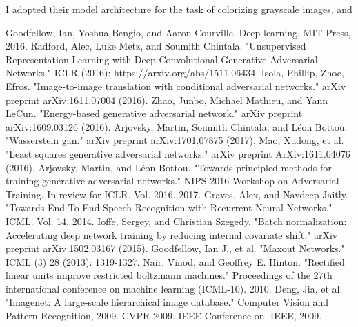 \documentclass{article}
\begin{document}
\noindent I adopted their model architecture for the task of colorizing grayscale images, and 



\pagebreak

\noindent [1] Goodfellow, Ian, Yoshua Bengio, and Aaron Courville. Deep learning. MIT Press, 2016. \newline
\noindent [2] Radford, Alec, Luke Metz, and Soumith Chintala. "Unsupervised Representation Learning with Deep Convolutional Generative Adversarial Networks." ICLR (2016): https://arxiv.org/abs/1511.06434. \newline
\noindent [3] Isola, Phillip, Zhoe, Efros. "Image-to-image translation with conditional adversarial networks." arXiv preprint arXiv:1611.07004 (2016). \newline
\noindent [4] Zhao, Junbo, Michael Mathieu, and Yann LeCun. "Energy-based generative adversarial network." arXiv preprint arXiv:1609.03126 (2016). \newline
\noindent [5] Arjovsky, Martin, Soumith Chintala, and Léon Bottou. "Wasserstein gan." arXiv preprint arXiv:1701.07875 (2017). \newline
\noindent [6] Mao, Xudong, et al. "Least squares generative adversarial networks." arXiv preprint ArXiv:1611.04076 (2016). \newline
\noindent [7] Arjovsky, Martin, and Léon Bottou. "Towards principled methods for training generative adversarial networks." NIPS 2016 Workshop on Adversarial Training. In review for ICLR. Vol. 2016. 2017. \newline
\noindent [8] Graves, Alex, and Navdeep Jaitly. "Towards End-To-End Speech Recognition with Recurrent Neural Networks." ICML. Vol. 14. 2014. \newline
\noindent [9] Ioffe, Sergey, and Christian Szegedy. "Batch normalization: Accelerating deep network training by reducing internal covariate shift." arXiv preprint arXiv:1502.03167 (2015). \newline
\noindent [10] Goodfellow, Ian J., et al. "Maxout Networks." ICML (3) 28 (2013): 1319-1327. \newline
\noindent [11] Nair, Vinod, and Geoffrey E. Hinton. "Rectified linear units improve restricted boltzmann machines." Proceedings of the 27th international conference on machine learning (ICML-10). 2010. \newline
\noindent [12] Deng, Jia, et al. "Imagenet: A large-scale hierarchical image database." Computer Vision and Pattern Recognition, 2009. CVPR 2009. IEEE Conference on. IEEE, 2009. \newline
\end{document}
